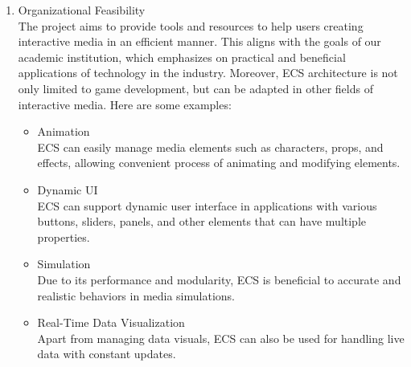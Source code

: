 \begin{enumerate}
    \item Organizational Feasibility\\
    The project aims to provide tools and resources to help users creating interactive media in an efficient manner.
    This aligns with the goals of our academic institution, which emphasizes on practical and beneficial applications of technology in the industry.
    Moreover, ECS architecture is not only limited to game development, but can be adapted in other fields of interactive media.
    Here are some examples:
    \begin{itemize}
        \item Animation\\
        ECS can easily manage media elements such as characters, props, and effects, allowing convenient process of animating and modifying elements.
        \item Dynamic UI\\
        ECS can support dynamic user interface in applications with various buttons, sliders, panels, and other elements that can have multiple properties.
        \item Simulation\\
        Due to its performance and modularity, ECS is beneficial to accurate and realistic behaviors in media simulations.
        \item Real-Time Data Visualization\\
        Apart from managing data visuals, ECS can also be used for handling live data with constant updates.
    \end{itemize}

\end{enumerate}